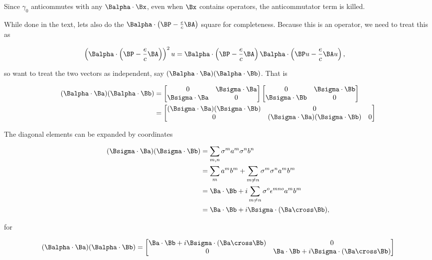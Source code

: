 Since $\gamma_0$ anticommutes with any $\Balpha \cdot \Bx$, even when $\Bx$ contains operators, the anticommutator term is killed.

While done in the text, lets also do the $\Balpha \cdot \left(\BP - \frac{e}{c} \BA \right)$ square for completeness.  Because this is an operator, we need to treat this as

\begin{align*}
\left( \Balpha \cdot \left(\BP - \frac{e}{c} \BA \right) \right)^2 u
&=
\Balpha \cdot \left(\BP - \frac{e}{c} \BA \right)
\Balpha \cdot \left(\BP u - \frac{e}{c} \BA u \right),
\end{align*}

so want to treat the two vectors as independent, say $(\Balpha \cdot \Ba)(\Balpha \cdot \Bb)$.  That is

\begin{align*}
(\Balpha \cdot \Ba)(\Balpha \cdot \Bb)
&=
\begin{bmatrix}
0 & \Bsigma \cdot \Ba \\
\Bsigma \cdot \Ba & 0
\end{bmatrix}
\begin{bmatrix}
0 & \Bsigma \cdot \Bb \\
\Bsigma \cdot \Bb & 0
\end{bmatrix} \\
&=
\begin{bmatrix}
(\Bsigma \cdot \Ba) (\Bsigma \cdot \Bb)  & 0 \\
0 & (\Bsigma \cdot \Ba) (\Bsigma \cdot \Bb)  & 0 \\
\end{bmatrix} \\
\end{align*}

The diagonal elements can be expanded by coordinates

\begin{align*}
(\Bsigma \cdot \Ba) (\Bsigma \cdot \Bb) 
&=
\sum_{m,n} \sigma^m a^m \sigma^n b^n \\
&=
\sum_m a^m b^m
+ 
\sum_{m\ne n} \sigma^m \sigma^n a^m b^m \\
&=
\Ba \cdot \Bb
+ 
i \sum_{m\ne n} \sigma^o \epsilon^{m n o} a^m b^m \\
&=
\Ba \cdot \Bb
+ 
i \Bsigma \cdot (\Ba \cross \Bb),
\end{align*}

for

\begin{equation}\label{eqn:diracGauge:n}
(\Balpha \cdot \Ba)(\Balpha \cdot \Bb)
=
\begin{bmatrix}
\Ba \cdot \Bb + i \Bsigma \cdot (\Ba \cross \Bb) & 0 \\
0 & \Ba \cdot \Bb + i \Bsigma \cdot (\Ba \cross \Bb)
\end{bmatrix} 
\end{equation}

